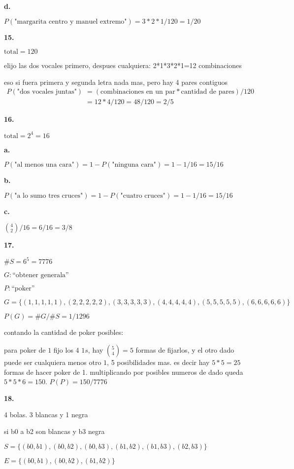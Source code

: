 \documentclass[12pt]{article}
\begin{document}
\textbf{d.}

$P(\textrm{"margarita centro y manuel extremo"})=3*2*1/120=1/20$

\textbf{15.}

$\textrm{total}=120$

elijo las dos vocales primero, despues cualquiera: 2*1*3*2*1=12 combinaciones

eso si fuera primera y segunda letra nada mas, pero hay 4 pares contiguos
\begin{align*}
  P(\textrm{"dos vocales juntas"})&=(\textrm{combinaciones en un par}*\textrm{cantidad de pares})/120\\
                                  &=12*4/120=48/120=2/5
\end{align*}

\textbf{16.}

$\textrm{total}=2^4=16$

\textbf{a.}

$P(\textrm{"al menos una cara"})=1-P(\textrm{"ninguna cara"})=1-1/16=15/16$

\textbf{b.}

$P(\textrm{"a lo sumo tres cruces"})=1-P(\textrm{"cuatro cruces"})=1-1/16=15/16$

\textbf{c.}

$\binom{4}{2}/16=6/16=3/8$

\textbf{17.}

$\#S=6^5=7776$

$G: \textrm{``obtener generala''}$

$P: \textrm{``poker''}$

$G=\{(1,1,1,1,1),(2,2,2,2,2),(3,3,3,3,3),(4,4,4,4,4),(5,5,5,5,5),(6,6,6,6,6)\}$

$P(G)=\#G/\#S=1/1296$

contando la cantidad de poker posibles:

para poker de $1$ fijo los 4 $1s$, hay $\binom{5}{4}=5$ formas de fijarlos, y el otro dado puede ser cualquiera menos otro $1$, 5 posibilidades mas. es decir hay $5*5=25$ formas de hacer poker de 1. multiplicando por posibles numeros de dado queda $5*5*6=150$. $P(P)=150/7776$

\textbf{18.}

4 bolas. 3 blancas y 1 negra

si b0 a b2 son blancas y b3 negra

$S=\{(b0,b1),(b0,b2),(b0,b3),(b1,b2),(b1,b3),(b2,b3)\}$

$E=\{(b0,b1),(b0,b2),(b1,b2)\}$
\end{document}
